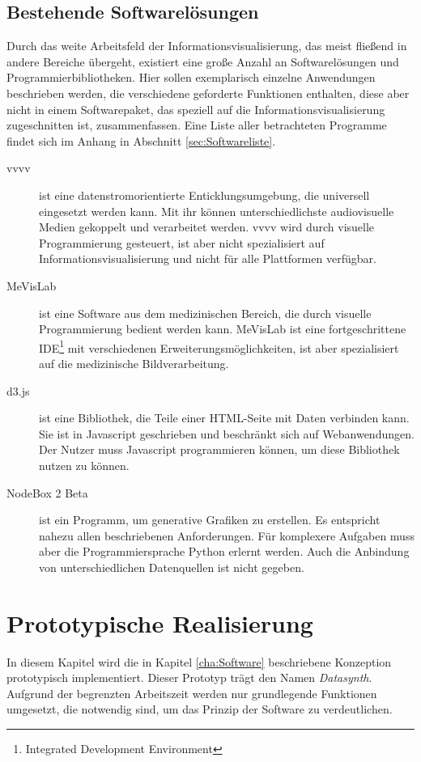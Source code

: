 \documentclass[a4paper, 
               12pt,
               DIV=calc,
               version=first,
               pdftex,
               headsepline,
               footsepline,
               bibtotocnumbered,
               liststotocnumbered]{scrreprt}
\begin{document}
\section{Bestehende Softwarelösungen}
\label{sec:bestehendeSoftware}
Durch das weite Arbeitsfeld der Informationsvisualisierung, das meist
fließend in andere Bereiche übergeht, existiert eine große Anzahl an
Softwarelösungen und Programmierbibliotheken. Hier sollen exemplarisch
einzelne Anwendungen beschrieben werden, die verschiedene geforderte
Funktionen enthalten, diese aber nicht in einem Softwarepaket, das
speziell auf die Informationsvisualisierung zugeschnitten ist, zusammenfassen.
Eine Liste aller betrachteten Programme findet sich im Anhang in Abschnitt
\ref{sec:Softwareliste}.
\begin{description}
\item[vvvv]
ist eine datenstromorientierte Enticklungsumgebung, die universell eingesetzt werden kann.
Mit ihr können unterschiedlichste audiovisuelle Medien gekoppelt und
verarbeitet werden. vvvv wird durch visuelle Programmierung gesteuert, ist aber
nicht spezialisiert auf Informationsvisualisierung und nicht für alle
Plattformen verfügbar.
\item[MeVisLab]
ist eine Software aus dem medizinischen Bereich, die durch visuelle
Programmierung bedient werden kann. MeVisLab ist eine fortgeschrittene
IDE\footnote{Integrated Development Environment} mit verschiedenen
Erweiterungsmöglichkeiten, ist aber spezialisiert auf die medizinische
Bildverarbeitung.
\item[d3.js]
ist eine Bibliothek, die Teile einer HTML-Seite mit Daten verbinden kann.
Sie ist in Javascript geschrieben und beschränkt sich auf
Webanwendungen. Der Nutzer muss Javascript programmieren können, um diese
Bibliothek nutzen zu können.
\item[NodeBox 2 Beta]
ist ein Programm, um generative Grafiken zu erstellen. Es entspricht nahezu
allen beschriebenen Anforderungen. Für komplexere Aufgaben muss aber
die Programmiersprache Python erlernt werden. Auch die Anbindung von unterschiedlichen Datenquellen
ist nicht gegeben.
\end{description}

\chapter{Prototypische Realisierung}
\label{cha:Umsetzung}
In diesem Kapitel wird die in Kapitel \ref{cha:Software} beschriebene Konzeption prototypisch implementiert.
Dieser Prototyp trägt den Namen \textit{Datasynth}.
Aufgrund der begrenzten Arbeitszeit werden nur grundlegende Funktionen umgesetzt,
die notwendig sind, um das Prinzip der Software zu verdeutlichen.
\end{document}

